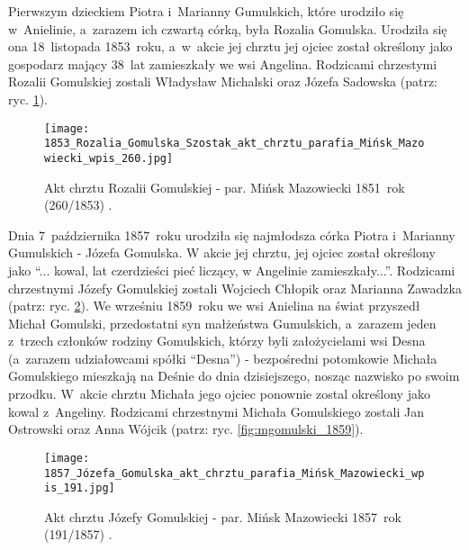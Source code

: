 Pierwszym dzieckiem Piotra i~Marianny Gumulskich, które urodziło się
w~Anielinie, a~zarazem ich czwartą córką, była Rozalia Gomulska. Urodziła się
ona 18~listopada 1853~roku, a~w~akcie jej chrztu jej ojciec został określony 
jako gospodarz mający 38~lat zamieszkały we wsi Angelina. Rodzicami chrzestymi 
Rozalii Gomulskiej zostali Władysław Michalski oraz Józefa Sadowska 
(patrz: ryc. \ref{fig:rgomulska_1853}).

\begin{figure}[!ht]
    \vspace*{0.5cm}
    \centering \texttt{[image: 
        1853\_Rozalia\_Gomulska\_Szostak\_akt\_chrztu\_parafia\_Mińsk\_Mazowiecki\_wpis\_260.jpg]}
    \captionsetup{format=hang}
    \caption{Akt chrztu Rozalii Gomulskiej - par. Mińsk Mazowiecki 1851~rok 
    (260/1853) \cite{par_minsk2}.}
    \label{fig:rgomulska_1853}
\end{figure}

Dnia 7~października 1857~roku urodziła się najmłodsza córka Piotra i~Marianny
Gumulskich - Józefa Gomulska. W akcie jej chrztu, jej ojciec został określony 
jako \enquote{... kowal, lat czerdzieści pieć liczący, w Angelinie
zamieszkały...}. Rodzicami chrzestnymi Józefy Gomulskiej zostali Wojciech
Chłopik oraz Marianna Zawadzka (patrz: ryc. \ref{fig:jgomulska_1857}). We 
wrześniu 1859~roku we wsi Anielina na świat przyszedł Michał Gomulski, 
przedostatni syn małżeństwa Gumulskich, a~zarazem jeden z~trzech członków
rodziny Gomulskich, którzy byli założycielami wsi Desna (a~zarazem 
udziałowcami spółki \enquote{Desna}) - bezpośredni potomkowie Michała 
Gomulskiego mieszkają na Deśnie do dnia dzisiejszego, nosząc nazwisko po 
swoim przodku. W~akcie chrztu Michała jego ojciec ponownie zostal określony 
jako kowal z~Angeliny. Rodzicami chrzestnymi Michała Gomulskiego zostali Jan 
Ostrowski oraz Anna Wójcik (patrz: ryc. \ref{fig:mgomulski_1859}). 

\begin{figure}[!ht]
    \vspace*{0.5cm}
    \centering \texttt{[image: 
        1857\_Józefa\_Gomulska\_akt\_chrztu\_parafia\_Mińsk\_Mazowiecki\_wpis\_191.jpg]}
    \captionsetup{format=hang}
    \caption{Akt chrztu Józefy Gomulskiej - par. Mińsk Mazowiecki 1857~rok 
    (191/1857) \cite{par_minsk2}.}
    \label{fig:jgomulska_1857}
\end{figure}

